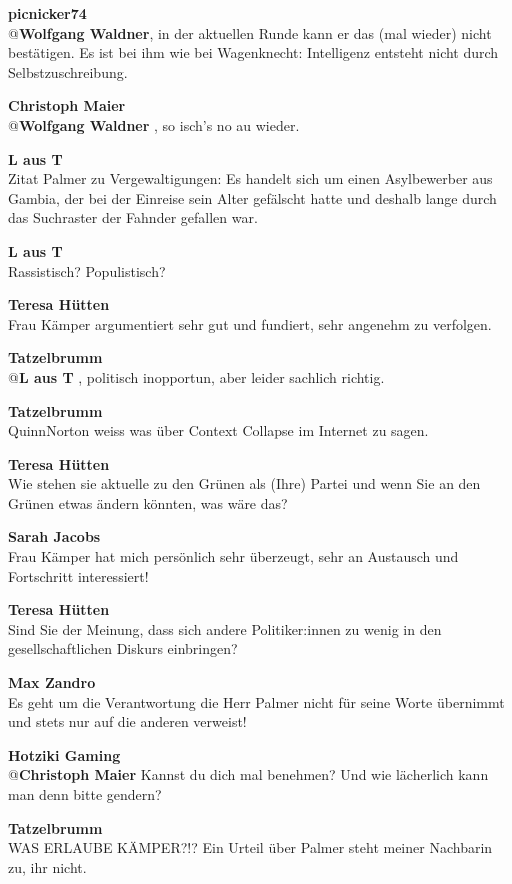\documentclass[a4,parindent=0pt]{article}
\begin{document}
\textbf{picnicker74}\\
@\textbf{Wolfgang Waldner}, in der aktuellen Runde kann er das (mal wieder)
nicht bestätigen. Es ist bei ihm wie bei Wagenknecht: Intelligenz
entsteht nicht durch Selbstzuschreibung.

\textbf{Christoph Maier}\\
@\textbf{Wolfgang Waldner} , so isch's no au wieder.

\textbf{L aus T}\\
Zitat Palmer zu Vergewaltigungen: Es handelt sich um einen Asylbewerber
aus Gambia, der bei der Einreise sein Alter gefälscht hatte und deshalb
lange durch das Suchraster der Fahnder gefallen war.

\textbf{L aus T}\\
Rassistisch? Populistisch?

\textbf{Teresa Hütten}\\
Frau Kämper argumentiert sehr gut und fundiert, sehr angenehm zu
verfolgen.

\textbf{Tatzelbrumm}\\
@\textbf{L aus T} , politisch inopportun, aber leider sachlich richtig.

\textbf{Tatzelbrumm}\\
QuinnNorton\cite{quinnnorton} weiss was über
Context Collapse\cite{contextcollapse} im Internet zu
sagen.

\textbf{Teresa Hütten}\\
Wie stehen sie aktuelle zu den Grünen als (Ihre) Partei und wenn Sie an
den Grünen etwas ändern könnten, was wäre das?

\textbf{Sarah Jacobs}\\
Frau Kämper hat mich persönlich sehr überzeugt, sehr an Austausch und
Fortschritt interessiert!

\textbf{Teresa Hütten}\\
Sind Sie der Meinung, dass sich andere Politiker:innen zu wenig in den
gesellschaftlichen Diskurs einbringen?

\textbf{Max Zandro}\\
Es geht um die Verantwortung die Herr Palmer nicht für seine Worte
übernimmt und stets nur auf die anderen verweist!

\textbf{Hotziki Gaming}\\
@\textbf{Christoph Maier} Kannst du dich mal benehmen? Und wie lächerlich
kann man denn bitte gendern?

\textbf{Tatzelbrumm}\\
WAS ERLAUBE KÄMPER?!? Ein Urteil über Palmer steht meiner Nachbarin zu,
ihr nicht.
\end{document}
